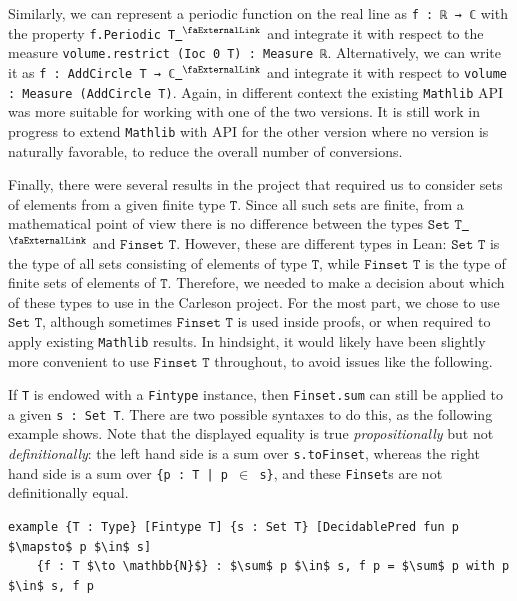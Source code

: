 \documentclass[12pt]{amsart}
\newcounter{lstlisting}[section]
\newcommand{\lean}[1]{\lstinline{#1}}
\newcommand{\mathlib}{\texttt{Mathlib}\xspace}
\newcommand{\extlink}{~\ensuremath{{}^\text{\faExternalLink}}}
\theoremstyle{definition}
\theoremstyle{plain}
\begin{document}
Similarly, we can represent a periodic function on the real line as \lean{f : ℝ → ℂ} with the property \lean{f.Periodic T}\href{https://github.com/leanprover-community/mathlib4/blob/81a5d257c8e410db227a6665ed08f64fea08e997/Mathlib/Algebra/Ring/Periodic.lean#L45}{\extlink} and integrate it with respect to the measure \lean{volume.restrict (Ioc 0 T) : Measure ℝ}. Alternatively, we can write it as \lean{f : AddCircle T → ℂ}\href{https://github.com/leanprover-community/mathlib4/blob/81a5d257c8e410db227a6665ed08f64fea08e997/Mathlib/Topology/Instances/AddCircle/Defs.lean#L193}{\extlink} and integrate it with respect to \lean{volume : Measure (AddCircle T)}.
Again, in different context the existing \mathlib API was more suitable for working with one of the two versions. It is still work in progress to extend \mathlib with API for the other version where no version is naturally favorable, to reduce the overall number of conversions.

Finally, there were several results in the project that required us to consider sets of elements from a given finite type $\texttt{T}$. Since all such sets are finite, from a mathematical point of view there is no difference between the types $\texttt{Set T}$\href{https://github.com/leanprover-community/mathlib4/blob/81a5d257c8e410db227a6665ed08f64fea08e997/Mathlib/Data/Set/Defs.lean#L43-L50}{\extlink} and $\texttt{Finset T}$.
However, these are different types in Lean: $\texttt{Set T}$ is the type of all sets consisting of elements of type $\texttt{T}$, while $\texttt{Finset T}$ is the type of finite sets of elements of $\texttt{T}$. Therefore, we needed to make a decision about which of these types to use in the Carleson project. For the most part, we chose to use $\texttt{Set T}$, although sometimes $\texttt{Finset T}$ is used inside proofs, or when required to apply existing \mathlib results. In hindsight, it would likely have been slightly more convenient to use $\texttt{Finset T}$ throughout, to avoid issues like the following.

If \texttt{T} is endowed with a \texttt{Fintype} instance, then \texttt{Finset.sum} can still be applied to a given \texttt{s : Set T}. There are two possible syntaxes to do this, as the following example shows. Note that the displayed equality is true \emph{propositionally} but not \emph{definitionally}: the left hand side is a sum over \texttt{s.toFinset}, whereas the right hand side is a sum over \texttt{\{p : T | p $\in$ s\}}, and these \texttt{Finset}s are not definitionally equal.
\begin{lstlisting}[mathescape]
example {T : Type} [Fintype T] {s : Set T} [DecidablePred fun p $\mapsto$ p $\in$ s]
	{f : T $\to \mathbb{N}$} : $\sum$ p $\in$ s, f p = $\sum$ p with p $\in$ s, f p
\end{lstlisting}
\end{document}

